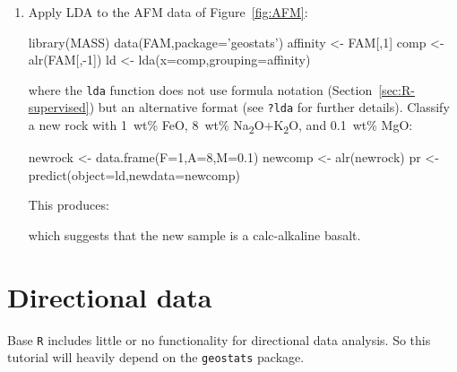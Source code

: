 \begin{enumerate}
\item Apply LDA to the AFM data of Figure~\ref{fig:AFM}:

\begin{script}
library(MASS)    
data(FAM,package='geostats')
affinity <- FAM[,1]
comp <- alr(FAM[,-1])
ld <- lda(x=comp,grouping=affinity)
\end{script}

\noindent where the \texttt{lda} function does not use formula
notation (Section~\ref{sec:R-supervised}) but an alternative format
(see \texttt{?lda} for further details).  Classify a new rock with
1~wt\% FeO, 8~wt\% Na\textsubscript{2}O+K\textsubscript{2}O, and
0.1~wt\% MgO:

\begin{script}[firstnumber=4]
newrock <- data.frame(F=1,A=8,M=0.1)
newcomp <- alr(newrock)
pr <- predict(object=ld,newdata=newcomp)
\end{script}

This produces:


\noindent which suggests that the new sample is a calc-alkaline
basalt.

\end{enumerate}

\section{Directional data}
\label{sec:R-directional}

Base \texttt{R} includes little or no functionality for directional
data analysis. So this tutorial will heavily depend on the
\texttt{geostats} package.


